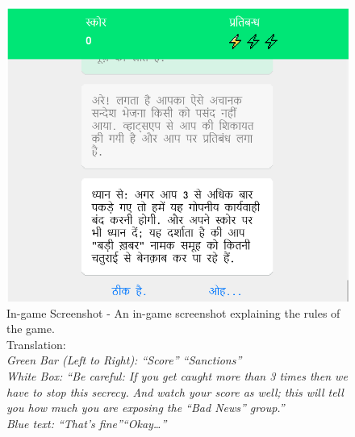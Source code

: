 \documentclass[empirical, authordate]{jote-new-article}
\begin{document}
\begin{figure}

  \includegraphics[width=\linewidth]{media/supplement/images6.jpeg}

  \caption{In-game Screenshot - An in-game screenshot explaining the rules of the game. \\
    Translation: \\
    \emph{Green Bar (Left to Right): “Score” “Sanctions”} \\
    \emph{White Box: “Be careful: If you get caught more than 3 times then we have to stop this secrecy. }\emph{And watch your score as well; this will tell you how much you are exposing the “Bad News” group.”} \\
    \emph{Blue text: “That's fine”}\emph{}\emph{“Okay…”}
  }
  \label{}


\end{figure}












\clearpage
\end{document}
